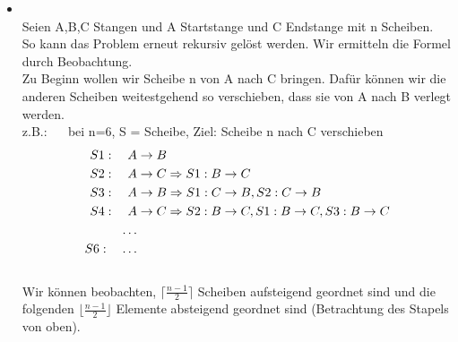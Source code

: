 \begin{itemize}{a)}
\begin{itemize}
\begin{proof}
\begin{itemize}
\begin{equation}
\begin{aligned}
 									   &= 2^{n+1} -1 \\
 							\end{aligned}
 						\end{equation}					
 				\end{itemize}
 			\end{proof}
 			\item Also gilt für $n=100$:\\
 				\begin{equation}
 					\begin{aligned}
 						2^{100}-1 &= 1,2676506*10^{30} \quad \text{Tage} \notag \\
 								  &= 3,5 * 10^{27} \quad \text{Jahre} \\ 	
 								  
 					\end{aligned}
 				\end{equation}
 		\end{itemize}
 		\item \\
 			Seien A,B,C Stangen und A Startstange und C Endstange mit n Scheiben. \\
 			So kann das Problem erneut rekursiv gelöst werden. Wir ermitteln die Formel durch Beobachtung. \\ 			
 			Zu Beginn wollen wir Scheibe n von A nach C bringen. Dafür können wir die anderen Scheiben weitestgehend so verschieben, dass sie von A nach B verlegt werden. \\
 			z.B.: $\quad$ bei n=6, S = Scheibe, Ziel: Scheibe n nach C verschieben \\
 			\begin{equation}
 				\begin{aligned}
 					S1: \quad A &\rightarrow B \\
 					S2: \quad A &\rightarrow C \Rightarrow S1: B \rightarrow C \\
 					S3: \quad A &\rightarrow B \Rightarrow S1: C \rightarrow B, S2: C \rightarrow B \\
 					S4: \quad A &\rightarrow C \Rightarrow S2: B \rightarrow C, S1: B\rightarrow C, S3: B \rightarrow C \notag \\
 					\dots \\
 					S6: \quad \dots \\					
 				\end{aligned}
			\end{equation} 	\\ 	
			Wir können beobachten, $\lceil{ \frac{n-1}{2} }\rceil$ Scheiben aufsteigend geordnet sind und die folgenden $\lfloor{\frac{n-1}{2}}\rfloor$ Elemente absteigend geordnet sind (Betrachtung des Stapels von oben). \\

\end{itemize}
